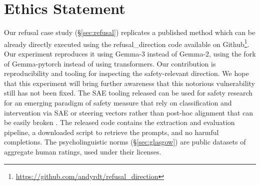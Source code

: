 \documentclass[11pt]{article}
\begin{document}
\section*{Ethics Statement}
Our refusal case study (\S\ref{sec:refusal}) replicates a published method \cite{arditi2024refusallanguagemodelsmediated} which can be already directly executed using the refusal\_direction code available on Github\footnote{\url{https://github.com/andyrdt/refusal_direction}}. Our experiment reproduces it using Gemma-3 instead of Gemma-2, using the fork of Gemma-pytorch instead of using transformers. Our contribution is reproducibility and tooling for inspecting the safety-relevant direction. We hope that this experiment will bring further awareness that this notorious vulnerability still has not been fixed. The SAE tooling released can be used for safety research for an emerging paradigm of safety measure that rely on classification and intervention via SAE or steering vectors rather than  post-hoc alignment that can be easily broken \cite{lu2026assistantaxissituatingstabilizing}. The released code contains the extraction and evaluation pipeline, a downloaded script to retrieve the prompts, and no harmful completions. The psycholinguistic norms (\S\ref{sec:glasgow}) are public datasets of aggregate human ratings, used under their licenses.





\end{document}

